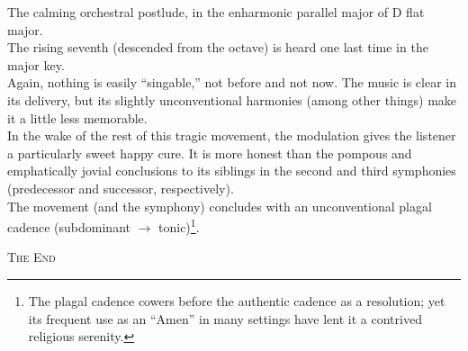 \documentclass{beamer}
\begin{document}
\begin{frame}
  The calming orchestral postlude, in the enharmonic parallel major of D flat major. 
  \pause \\
  The rising seventh (descended from the octave) is heard one last time in the major key. 
  \pause \\
  Again, nothing is easily ``singable,'' not before and not now. The music is clear in its delivery, but its slightly unconventional harmonies (among other things) make it a little less memorable. 
  \pause \\ 
  In the wake of the rest of this tragic movement, the modulation gives the listener a particularly sweet happy cure. It is more honest than the pompous and emphatically jovial conclusions to its siblings in the second and third symphonies (predecessor and successor, respectively). 
  \pause \\
  The movement (and the symphony) concludes with an unconventional plagal cadence (subdominant \(\to\) tonic)\footnote{The plagal cadence cowers before the authentic cadence as a resolution; yet its frequent use as an ``Amen'' in many settings have lent it a contrived religious serenity.}. 
\end{frame} 

\begin{frame}
  \begin{center} 
    {\Large\textsc{The End} } 
  \end{center} 
\end{frame} 
\end{document}
